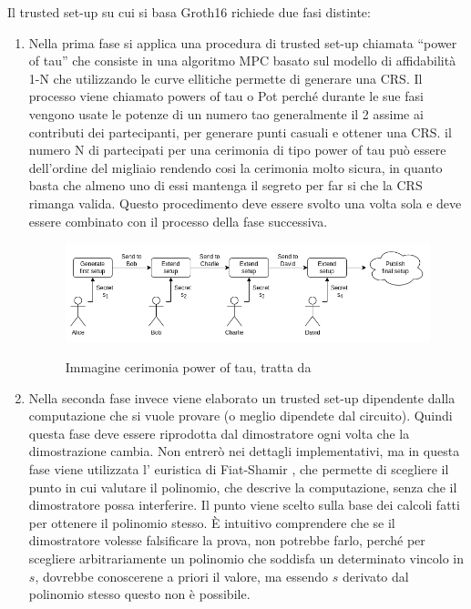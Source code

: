 Il trusted set-up su cui si basa Groth16 richiede due fasi distinte:
\begin{enumerate}
    \item Nella prima fase si applica una procedura di trusted set-up chiamata “power of tau” che consiste in una algoritmo MPC
    basato sul modello di affidabilità 1-N che utilizzando le curve ellitiche permette di generare una CRS. Il processo viene
    chiamato powers of tau o Pot perché durante le sue fasi vengono usate le potenze di un numero tao generalmente il 2
    assime ai contributi dei partecipanti, per generare punti casuali e ottener una CRS. il numero N di partecipati per una
    cerimonia di tipo power of tau può essere dell'ordine del migliaio rendendo cosi la cerimonia molto
    sicura, in quanto basta che almeno uno di essi mantenga il segreto per far si che la CRS rimanga valida. Questo
    procedimento deve essere svolto una volta sola e deve essere combinato con il processo della fase successiva.
    \begin{figure}[H]
        \centering
        \includegraphics[width=13cm]{./chapters/1.state-of-art/images/13.power_of_tao.png}
        \label{fig:powers_of_tao}
        \captionsetup{justification=centering}
        \caption{Immagine cerimonia power of tau, tratta da \cite{how-do-trusted-setups-work}}
    \end{figure}
    \item Nella seconda fase invece viene elaborato un trusted set-up dipendente dalla computazione che si vuole provare (o
    meglio dipendete dal circuito). Quindi questa fase deve essere riprodotta dal dimostratore ogni volta che la
    dimostrazione cambia. Non entrerò nei dettagli implementativi, ma in questa fase viene utilizzata l' euristica di Fiat-Shamir
    , che permette di scegliere il punto in cui valutare il polinomio, che descrive la computazione, senza che il
    dimostratore possa interferire. Il punto viene scelto sulla base dei calcoli fatti per ottenere il polinomio stesso. È
    intuitivo comprendere che se il dimostratore volesse falsificare la prova, non potrebbe farlo, perché per scegliere
    arbitrariamente un polinomio che soddisfa un determinato vincolo in $s$, dovrebbe conoscerene a priori il valore, ma essendo
    $s$ derivato dal polinomio stesso questo non è possibile.
\end{enumerate}

